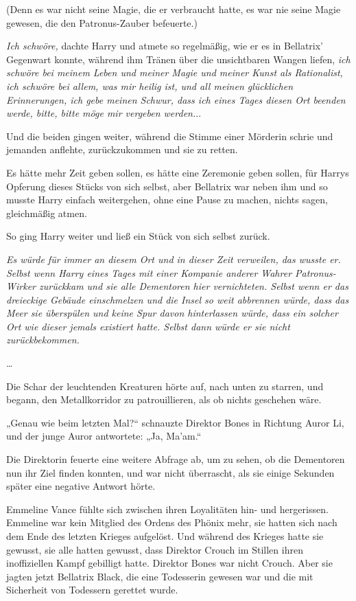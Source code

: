 {(Denn es war nicht seine Magie, die er verbraucht hatte, es war nie seine Magie gewesen, die den Patronus-Zauber befeuerte.)

\emph{Ich schwöre,} dachte Harry und atmete so regelmäßig, wie er es in Bellatrix' Gegenwart konnte, während ihm Tränen über die unsichtbaren Wangen liefen, \emph{ich schwöre bei meinem Leben und meiner Magie und meiner Kunst als Rationalist, ich schwöre bei allem, was mir heilig ist, und all meinen glücklichen Erinnerungen, ich gebe meinen Schwur, dass ich eines Tages diesen Ort beenden werde, bitte, bitte möge mir vergeben werden.}..

Und die beiden gingen weiter, während die Stimme einer Mörderin schrie und jemanden anflehte, zurückzukommen und sie zu retten.

Es hätte mehr Zeit geben sollen, es hätte eine Zeremonie geben sollen, für Harrys Opferung dieses Stücks von sich selbst, aber Bellatrix war neben ihm und so musste Harry einfach weitergehen, ohne eine Pause zu machen, nichts sagen, gleichmäßig atmen.

So ging Harry weiter und ließ ein Stück von sich selbst zurück.

\emph{Es würde für immer an diesem Ort und in dieser Zeit verweilen, das wusste er. Selbst wenn Harry eines Tages mit einer Kompanie anderer Wahrer Patronus-Wirker zurückkam und sie alle Dementoren hier vernichteten. Selbst wenn er das dreieckige Gebäude einschmelzen und die Insel so weit abbrennen würde, dass das Meer sie überspülen und keine Spur davon hinterlassen würde, dass ein solcher Ort wie dieser jemals existiert hatte. Selbst dann würde er sie nicht zurückbekommen.}

…

Die Schar der leuchtenden Kreaturen hörte auf, nach unten zu starren, und begann, den Metallkorridor zu patrouillieren, als ob nichts geschehen wäre.

„Genau wie beim letzten Mal?“ schnauzte Direktor Bones in Richtung Auror Li, und der junge Auror antwortete: „Ja, Ma'am.“

Die Direktorin feuerte eine weitere Abfrage ab, um zu sehen, ob die Dementoren nun ihr Ziel finden konnten, und war nicht überrascht, als sie einige Sekunden später eine negative Antwort hörte.

Emmeline Vance fühlte sich zwischen ihren Loyalitäten hin- und hergerissen. Emmeline war kein Mitglied des Ordens des Phönix mehr, sie hatten sich nach dem Ende des letzten Krieges aufgelöst. Und während des Krieges hatte sie gewusst, sie alle hatten gewusst, dass Direktor Crouch im Stillen ihren inoffiziellen Kampf gebilligt hatte. Direktor Bones war nicht Crouch. Aber sie jagten jetzt Bellatrix Black, die eine Todesserin gewesen war und die mit Sicherheit von Todessern gerettet wurde.

}

